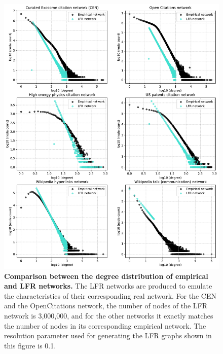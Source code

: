 \documentclass[a4paper]{article}   	%
\begin{document}
 \clearpage

\begin{figure}[H]
\centering
\includegraphics[width=0.85\linewidth]{figs/all_degrees.pdf}
\caption[Comparison between the degree distribution of empirical and LFR networks.]{\textbf{Comparison between the degree distribution of empirical and LFR networks.} The LFR networks are produced to emulate the characteristics of their corresponding real network. For the CEN and the OpenCitations network, the number of nodes of the LFR network is 3,000,000, and for the other networks it exactly matches the number of nodes in its corresponding empirical network. The resolution parameter used for generating the LFR graphs shown in this figure is 0.1. }
\label{fig:all-degrees}
\end{figure}
\end{document}
